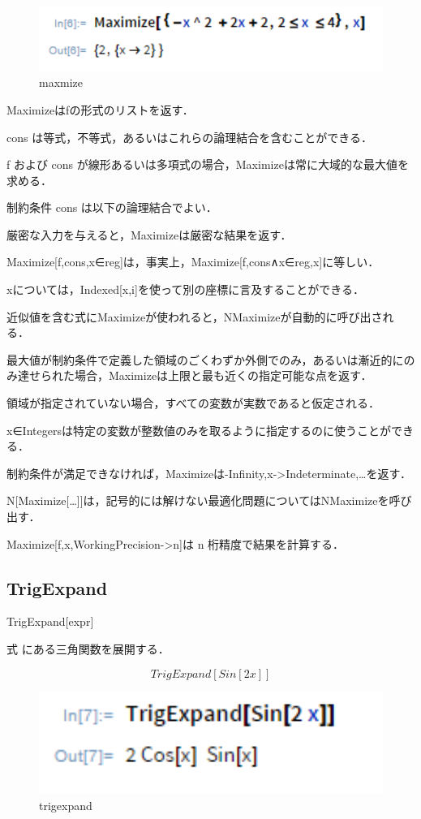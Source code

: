 \begin{figure}[h]
\centering
\includegraphics[width=15cm]{maxmize.png}
\caption{maxmize}\label{図}
\end{figure}

Maximizeはfの形式のリストを返す．

cons は等式，不等式，あるいはこれらの論理結合を含むことができる．

f および cons が線形あるいは多項式の場合，Maximizeは常に大域的な最大値を求める．

制約条件 cons は以下の論理結合でよい．

厳密な入力を与えると，Maximizeは厳密な結果を返す．

Maximize[{f,cons},x∈reg]は，事実上，Maximize[{f,cons∧x∈reg},x]に等しい．

 xについては，Indexed[x,i]を使って別の座標に言及することができる．
 
近似値を含む式にMaximizeが使われると，NMaximizeが自動的に呼び出される．

最大値が制約条件で定義した領域のごくわずか外側でのみ，あるいは漸近的にのみ達せられた場合，Maximizeは上限と最も近くの指定可能な点を返す．

領域が指定されていない場合，すべての変数が実数であると仮定される．

x∈Integersは特定の変数が整数値のみを取るように指定するのに使うことができる．

制約条件が満足できなければ，Maximizeは{-Infinity,{x->Indeterminate,…}}を返す．

N[Maximize[…]]は，記号的には解けない最適化問題についてはNMaximizeを呼び出す．

Maximize[f,x,WorkingPrecision->n]は n 桁精度で結果を計算する．

\clearpage

\subsection {TrigExpand}

TrigExpand[expr]

式 にある三角関数を展開する．

\[TrigExpand[Sin[2 x]]\]

\begin{figure}[h]
\centering
\includegraphics[width=15cm]{trigexpand.png}
\caption{trigexpand}\label{図}
\end{figure}


